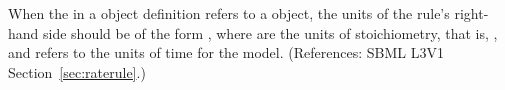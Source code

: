 When the  in a \RateRule object definition refers to a
\SpeciesReference object, the units of the rule's right-hand side should be
of the form , where  are the units of
stoichiometry, that is, , and  refers
to the units of time for the model.  (References: SBML L3V1
Section~\ref{sec:raterule}.)
